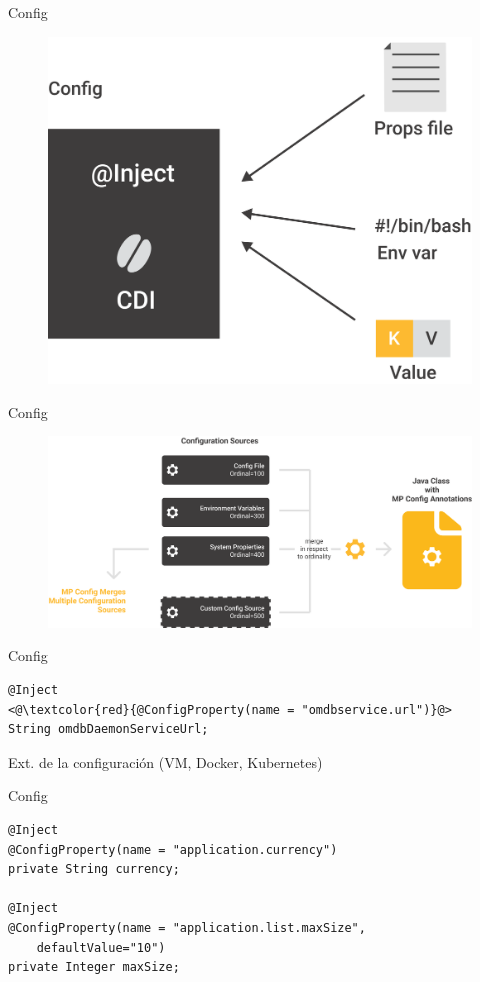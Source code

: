 \documentclass[aspectratio=169]{beamer}
\begin{document}
\begin{frame}{Config}
\begin{figure}
	\centering
	\includegraphics[width=0.65\linewidth]{Images/config}
\end{figure}
\end{frame}

\begin{frame}{Config}
\begin{figure}
	\centering
	\includegraphics[width=0.8\linewidth]{Images/mpconfig}
\end{figure}
\end{frame}




\begin{frame}[fragile]{Config}
\begin{lstlisting}
@Inject
<@\textcolor{red}{@ConfigProperty(name = "omdbservice.url")}@>
String omdbDaemonServiceUrl;
\end{lstlisting}

Ext. de la configuración (VM, Docker, Kubernetes)
\end{frame}



\begin{frame}[fragile]{Config}
\begin{lstlisting}
@Inject
@ConfigProperty(name = "application.currency")
private String currency;

@Inject
@ConfigProperty(name = "application.list.maxSize",
	defaultValue="10")
private Integer maxSize;
\end{lstlisting}
\end{frame}
\end{document}
